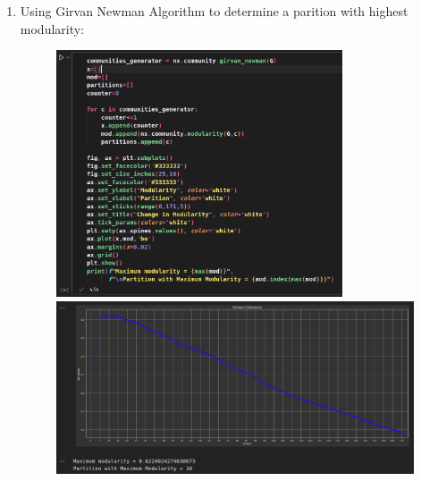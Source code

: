 \documentclass{article}
\begin{document}
\begin{enumerate}[label=(\alph*), left=10pt, itemsep=10pt]
        \item \begin{minipage}[t]{0.9\textwidth}
            Using Girvan Newman Algorithm to determine a parition with highest modularity:
            \begin{figure}[H]
                \centering
                \includegraphics[width=0.8\textwidth, height=0.4\textheight]{./1f.png}
                \includegraphics[width=1\textwidth, height=0.3\textheight]{./1fi.png}
            \end{figure}
        \end{minipage}


\end{enumerate}
\end{document}
